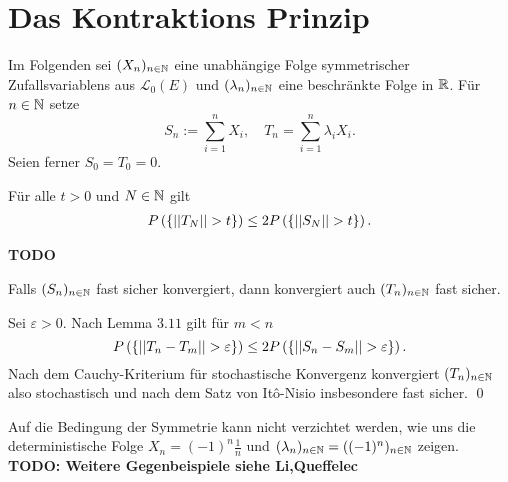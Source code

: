 \section{Das Kontraktions Prinzip}
Im Folgenden sei $(X_n)_{n \in \mathbb{N}}$ eine unabhängige Folge symmetrischer Zufallsvariablens aus $\mathcal{L}_0(E)$ und $(\lambda_n)_{n \in \mathbb{N}}$ eine beschränkte Folge in $\mathbb{R}$. 
Für $n \in \mathbb{N}$ setze
$$
    S_n := \sum_{i=1}^nX_i, \quad T_n = \sum_{i=1}^n\lambda_iX_i. 
$$
Seien ferner $S_0 = T_0 = 0$. 
\begin{lemma}
    Für alle $t > 0$ und $N \in \mathbb{N}$ gilt
    \begin{align}
        P\left(\left\{ \lvert\lvert T_N \rvert\rvert > t \right\}\right) \leq 2 P\left(\left\{ \lvert\lvert S_N \rvert\rvert > t \right\}\right). 
    \end{align}
\end{lemma}

\begin{proof*}
    \textbf{TODO}
\end{proof*}

\begin{theorem}
    Falls $(S_n)_{n \in \mathbb{N}}$ fast sicher konvergiert, dann konvergiert auch $(T_n)_{n \in \mathbb{N}}$ fast sicher. 
\end{theorem}
\begin{proof*}
    Sei $\varepsilon > 0$. Nach Lemma $3.11$ gilt für $m < n$
    $$
        P\left(\left\{ \lvert\lvert T_n - T_m \rvert\rvert > \varepsilon \right\}\right) \leq 2P\left(\left\{ \lvert\lvert S_n - S_m \rvert\rvert > \varepsilon \right\}\right). 
    $$
    Nach dem Cauchy-Kriterium für stochastische Konvergenz konvergiert $(T_n)_{n \in \mathbb{N}}$ also stochastisch und nach dem Satz von Itô-Nisio insbesondere fast sicher. \qed
\end{proof*}

\begin{remark}
    Auf die Bedingung der Symmetrie kann nicht verzichtet werden, wie uns die deterministische Folge $X_n = (-1)^n \frac{1}{n}$ und $(\lambda_n)_{n \in \mathbb{N}} = ((-1)^{n})_{n \in \mathbb{N}}$ zeigen. 
    \newline 
    \textbf{TODO: Weitere Gegenbeispiele siehe Li,Queffelec}
\end{remark}